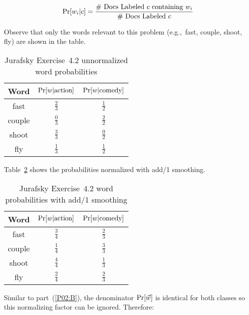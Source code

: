 \begin{equation}\label{eq:P02:BernoulliWordProb}
  \Pr\lbrack w_i \vert c\rbrack = \frac{\text{\# Docs Labeled } c \text{ containing } w_i}{\text{\# Docs Labeled } c}
\end{equation}

\noindent
Observe that only the words relevant to this problem (e.g.,~fast, couple, shoot, fly) are shown in the table.

\begin{table}[h]
  \centering
  \caption{Jurafsky Exercise~4.2 unnormalized word probabilities}\label{tab:P02:UnnormalWordProb}
  \begin{tabular}{|c||c|c|}
    \hline
    \textbf{Word}  & $\Pr\lbrack w \vert \text{action}\rbrack$ & $\Pr\lbrack w \vert \text{comedy}\rbrack$ \\\hline\hline
    fast           &  $\frac{2}{3}$  &  $\frac{1}{2}$ \\\hline
    couple         &  $\frac{0}{3}$  &  $\frac{2}{2}$ \\\hline
    shoot          &  $\frac{3}{3}$  &  $\frac{0}{2}$ \\\hline
    fly            &  $\frac{1}{3}$  &  $\frac{1}{2}$ \\\hline
  \end{tabular}
\end{table}

Table~\ref{tab:P02:NormalWordProb} shows the probabilities normalized with add\-/1 smoothing.

\begin{table}[h]
  \centering
  \caption{Jurafsky Exercise~4.2 word probabilities with add\-/1 smoothing}\label{tab:P02:NormalWordProb}
  \begin{tabular}{|c||c|c|}
    \hline
    \textbf{Word}  & $\Pr\lbrack w \vert \text{action}\rbrack$ & $\Pr\lbrack w \vert \text{comedy}\rbrack$ \\\hline\hline
    fast           &  $\frac{3}{4}$  &  $\frac{2}{3}$ \\\hline
    couple         &  $\frac{1}{4}$  &  $\frac{3}{3}$ \\\hline
    shoot          &  $\frac{4}{4}$  &  $\frac{1}{3}$ \\\hline
    fly            &  $\frac{2}{4}$  &  $\frac{2}{3}$ \\\hline
  \end{tabular}
\end{table}

Similar to part~(\ref{P02:B}), the denominator ${\Pr\lbrack\vec{w}\rbrack}$ is identical for both classes so this normalizing factor can be ignored.  Therefore:


